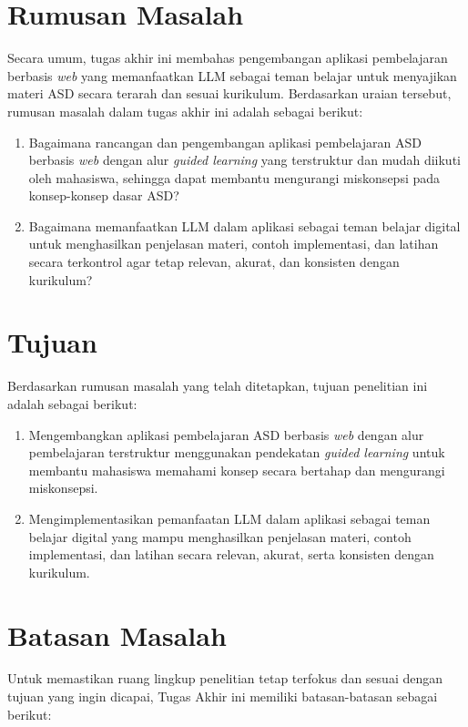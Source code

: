 \section{Rumusan Masalah}
Secara umum, tugas akhir ini membahas pengembangan aplikasi pembelajaran berbasis \textit{web} yang memanfaatkan LLM sebagai teman belajar untuk menyajikan materi ASD secara terarah dan sesuai kurikulum. Berdasarkan uraian tersebut, rumusan masalah dalam tugas akhir ini adalah sebagai berikut:
\begin{enumerate}
    \item Bagaimana rancangan dan pengembangan aplikasi pembelajaran ASD berbasis \textit{web} dengan alur \textit{guided learning} yang terstruktur dan mudah diikuti oleh mahasiswa, sehingga dapat membantu mengurangi miskonsepsi pada konsep-konsep dasar ASD?

    \item Bagaimana memanfaatkan LLM dalam aplikasi sebagai teman belajar digital untuk menghasilkan penjelasan materi, contoh implementasi, dan latihan secara terkontrol agar tetap relevan, akurat, dan konsisten dengan kurikulum?
\end{enumerate}
\section{Tujuan}
Berdasarkan rumusan masalah yang telah ditetapkan, tujuan penelitian ini adalah sebagai berikut:

\begin{enumerate}
    \item Mengembangkan aplikasi pembelajaran ASD berbasis \textit{web} dengan alur pembelajaran terstruktur menggunakan pendekatan \textit{guided learning} untuk membantu mahasiswa memahami konsep secara bertahap dan mengurangi miskonsepsi.

    \item Mengimplementasikan pemanfaatan LLM dalam aplikasi sebagai teman belajar digital yang mampu menghasilkan penjelasan materi, contoh implementasi, dan latihan secara relevan, akurat, serta konsisten dengan kurikulum.
\end{enumerate}
\section{Batasan Masalah}
Untuk memastikan ruang lingkup penelitian tetap terfokus dan sesuai dengan tujuan yang ingin dicapai, Tugas Akhir ini memiliki batasan-batasan sebagai berikut:

